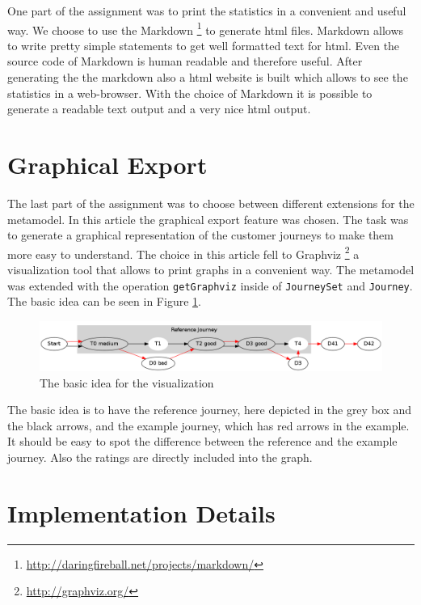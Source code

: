 \documentclass[12pt]{scrartcl}
\begin{document}
One part of the assignment was to print the statistics in a convenient and useful way. We choose to use the 
Markdown \footnote{\url{http://daringfireball.net/projects/markdown/}} to generate html files. Markdown allows
to write pretty simple statements to get well formatted text for html. Even the source code of Markdown is 
human readable and therefore useful. After generating the the markdown also a html website is built which allows
to see the statistics in a web-browser. With the choice of Markdown it is possible to generate a readable text
output and a very nice html output.

\section{Graphical Export} 
\label{section:export}

The last part of the assignment was to choose between different extensions for the metamodel. In this article
the graphical export feature was chosen. The task was to generate a graphical representation of the customer
journeys to make them more easy to understand. The choice in this article fell to Graphviz 
\footnote{\url{http://graphviz.org/}} a visualization tool that allows to print graphs in a convenient way.
The metamodel was extended with the operation \lstinline!getGraphviz! inside of \lstinline!JourneySet! and
\lstinline!Journey!. The basic idea can be seen in Figure \ref{figure:sample_figure}.

\begin{figure}[hbtp]
	\centering
	\includegraphics[scale=0.35]{img/sample_journey1.png}
	\caption{The basic idea for the visualization}
	\label{figure:sample_figure}
\end{figure}

The basic idea is to have the reference journey, here depicted in the grey box and the black arrows, and the 
example journey, which has red arrows in the example. It should be easy to spot the difference between the
reference and the example journey. Also the ratings are directly included into the graph.


\section{Implementation Details}
\label{section:impl}
\end{document}
